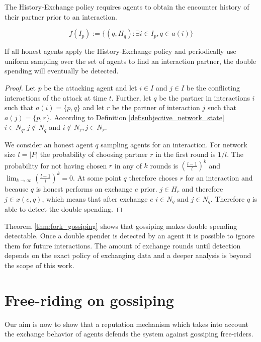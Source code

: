 \begin{pol}
    \label{pol:one}
    The History-Exchange policy requires agents to obtain the encounter history of their partner 
    prior to an interaction. 

    \[ f(I_p) := \{ (q, H_q) : \exists i \in I_p, q \in a(i) \}\]
\end{pol}


\begin{thm}
    \label{thm:fork_gossiping}
    If all honest agents apply the History-Exchange policy and periodically use uniform sampling over
    the set of agents to find an interaction partner, the double spending will eventually be detected.
\end{thm}
\begin{proof}
    Let $p$ be the attacking agent and let $i \in I$ and $j \in I$ be the conflicting interactions 
    of the attack at time $t$. Further, let $q$ be the partner in interactions $i$ such that 
    $a(i) = \{p, q\}$ and let $r$ be the partner of interaction $j$ such that $a(j) = \{p, r\}$. 
    According to Definition \ref{def:subjective_network_state} $i \in N_{q}, j \notin N_{q}$ and 
    $i \notin N_{r}, j \in N_{r}$.

    We consider an honest agent $q$ sampling agents for an interaction. For network size $l = |P|$ the 
    probability of choosing partner $r$ in the first round is $1/l$. The probability for not having
    chosen $r$ in any of $k$ rounds is $(\frac{l-1}{l})^k$ and $\lim_{k\to\infty}(\frac{l-1}{l})^k = 0$.
    At some point $q$ therefore choses $r$ for an interaction and because $q$ is honest performs an 
    exchange $e$ prior. $j \in H_r$ and therefore $j \in x(e, q)$, which means that after exchange 
    $e$ $i \in N_q \text{ and } j \in N_q$. Therefore $q$ is able to detect the double spending.
\end{proof}

Theorem \ref{thm:fork_gossiping} shows that gossiping makes double spending detectable. Once a double
spender is detected by an agent it is possible to ignore them for future interactions. The amount 
of exchange rounds until detection depends on the exact policy of exchanging data and a deeper 
analysis is beyond the scope of this work.

\section{Free-riding on gossiping}
Our aim is now to show that a reputation mechanism which takes into account the exchange behavior of 
agents defends the system against gossiping free-riders. 

